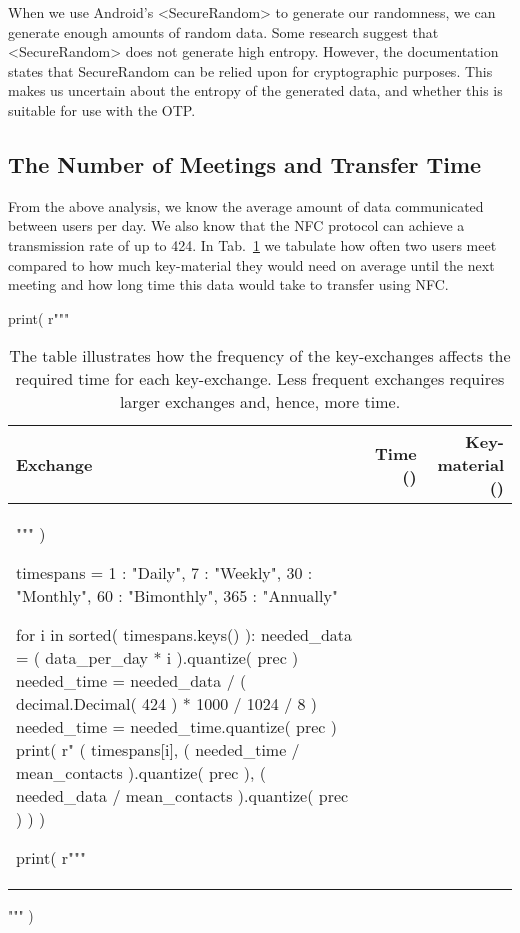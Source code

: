 When we use Android's <SecureRandom> to generate our randomness, we can 
generate enough amounts of random data.
Some research \cite{AndroidLowEntropyMyth,JavaRandomness} suggest that 
<SecureRandom> does not generate high entropy.
However, the documentation states that SecureRandom can be relied upon for 
cryptographic purposes.
This makes us uncertain about the entropy of the generated data, and whether 
this is suitable for use with the \ac{OTP}.

\subsection{The Number of Meetings and Transfer Time}
\label{sec:Meetings}
From the above analysis, we know the average amount of data communicated 
between users per day.
We also know that the \ac{NFC} protocol can achieve a transmission rate of up 
to \unit{424}{\kilo\bit\per\second}.
In Tab.~\ref{tbl:MeetingsTradeoff} we tabulate how often two users meet 
compared to how much key-material they would need on average until the next 
meeting and how long time this data would take to transfer using \ac{NFC}.

\begin{table}
  \centering
  \caption{%
    The table illustrates how the frequency of the key-exchanges affects the 
    required time for each key-exchange.
    Less frequent exchanges requires larger exchanges and, hence, more time.
  }
  \label{tbl:MeetingsTradeoff}
  \begin{pycode}[random]
print( r"""
\begin{tabular}{lrr}
  Exchange &
  Time (\second) &
  Key-material (\byte) \\
  \toprule
""" )

timespans = {
  1 : "Daily",
  7 : "Weekly",
  30 : "Monthly",
  60 : "Bimonthly",
  365 : "Annually"
}

for i in sorted( timespans.keys() ):
  needed_data = ( data_per_day * i ).quantize( prec )
  needed_time = needed_data / ( decimal.Decimal( 424 ) * 1000 / 1024 / 8 )
  needed_time = needed_time.quantize( prec )
  print( r"%
  ( timespans[i],
    ( needed_time / mean_contacts ).quantize( prec ),
    ( needed_data / mean_contacts ).quantize( prec )
    ) )

print( r"""
  \bottomrule
\end{tabular}
""" )
  \end{pycode}
\end{table}

